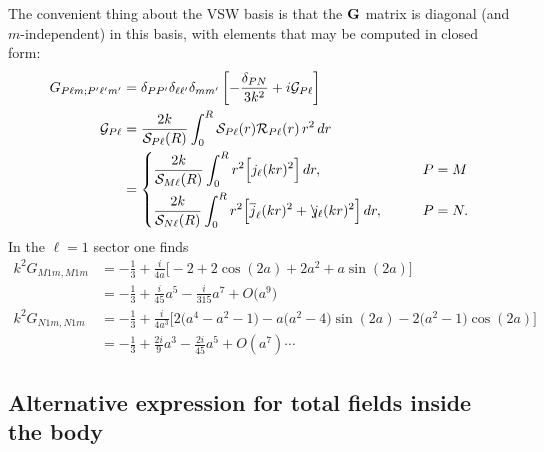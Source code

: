 \documentclass[letterpaper]{article}
\newcommand{\jslash}{\backslash\hspace{-0.05in}j}
\begin{document}
The convenient thing about the VSW basis is that the $\mathbf{G}$ matrix
is diagonal (and $m$-independent) in this basis, with elements that
may be computed in closed form:
\begin{align*}
 G_{P\ell m; P^\prime \ell^\prime m^\prime}
 &=\delta_{PP^\prime}
   \delta_{\ell \ell^\prime}
   \delta_{mm^\prime}
   \left[ -\frac{\delta_{PN}}{3k^2} + i\mc G_{P\ell} \right]
\\
\mc G_{P\ell}
&= \frac{2k}{\mc S_{P\ell}(R)}
     \int_0^R \mc S_{P\ell}(r) \mc R_{P\ell}(r) \, r^2 \, dr
\\
&=\begin{dcases}
   \frac{2k}{\mc S_{M\ell}(R)}
     \int_0^R r^2 \Big[ j_\ell(kr)^2\Big]  \, dr,
   \qquad &P=M 
\\
   \frac{2k}{\mc S_{N\ell}(R)}
     \int_0^R r^2 \Big[ \overline{j}_\ell(kr)^2 + \jslash_\ell(kr)^2
                  \Big]  \, dr,
   \qquad &P=N.
   \end{dcases}
\end{align*}
In the $\ell=1$ sector one finds
\begin{align*}
 k^2 G_{M1m,M1m}
&=-\frac{1}{3}
  +\frac{i}{4a}\Big[-2 + 2\cos(2a) + 2a^2 + a\sin(2a)\Big]
\\[3pt]
&=-\frac{1}{3}
  + \frac{i}{45}a^5
  - \frac{i}{315}a^7 + O\big( a^9 \big)
\\[6pt]
 k^2 G_{N1m,N1m}
&=-\frac{1}{3}
  +\frac{i}{4a^3}
   \Big[   2 \big(a^4-a^2-1\big) 
          -a \big(a^2-4\big) \sin (2 a)
          -2 \big(a^2-1\big) \cos (2 a)
   \Big]
\\[3pt]
&=-\frac{1}{3} + \frac{2i}{9}a^3 - \frac{2i}{45}a^5 + O(a^7) \cdots  
\end{align*}

\subsection{Alternative expression for total fields inside the 
body}
\end{document}
